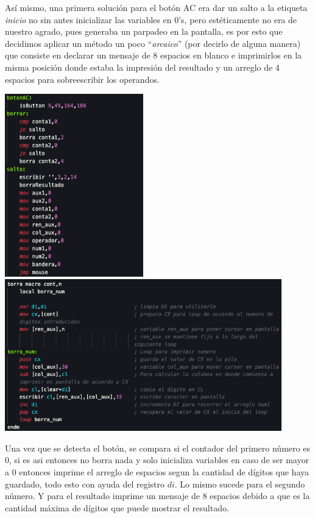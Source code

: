 \documentclass[letterpaper,12 pt,titlepage]{article}
\begin{document}
    Así mismo, una primera solución para el botón AC era dar un salto a la etiqueta \textit{inicio} no sin antes inicializar las variables en $0$'s, pero estéticamente no era de nuestro agrado, pues generaba un parpadeo en la pantalla, es por esto que decidimos aplicar un método un poco ``\textit{arcaico}'' (por decirlo de alguna manera) que consiste en declarar un mensaje de 8 espacios en blanco e imprimirlos en la misma posición donde estaba la impresión del resultado y un arreglo de 4 espacios para sobreescribir los operandos.

    \begin{center}
        \includegraphics[width=0.45\textwidth]{img/29.png}
        \includegraphics[width=0.9\textwidth]{img/30.png}
    \end{center}

    Una vez que se detecta el botón, se compara si el contador del primero número es $0$, si es asi entonces no borra nada y solo inicializa variables en caso de ser mayor a $0$ entonces imprime el arreglo de espacios segun la cantidad de dígitos que haya guardado, todo esto con ayuda del registro $di$. Lo mismo sucede para el segundo número. Y para el resultado imprime un mensaje de 8 espacios debido a que es la cantidad máxima de dígitos que puede mostrar el resultado.
\end{document}
